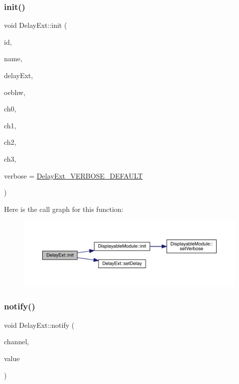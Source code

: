 \subsubsection{\texorpdfstring{init()}{init()}\hspace{0.1cm}{\footnotesize\ttfamily [2/2]}}
{\footnotesize\ttfamily void Delay\+Ext\+::init (\begin{DoxyParamCaption}\item[{int}]{id,  }\item[{char $\ast$}]{name,  }\item[{Audio\+Effect\+Delay\+External $\ast$}]{delay\+Ext,  }\item[{\mbox{\hyperlink{class_open_effects_box_h_w}{Open\+Effects\+Box\+HW}} $\ast$}]{oebhw,  }\item[{int}]{ch0,  }\item[{int}]{ch1,  }\item[{int}]{ch2,  }\item[{int}]{ch3,  }\item[{int}]{verbose = {\ttfamily \mbox{\hyperlink{_delay_ext_8h_a1c2b9cd031a3baecf2c7d96325dcb9b1}{Delay\+Ext\+\_\+\+V\+E\+R\+B\+O\+S\+E\+\_\+\+D\+E\+F\+A\+U\+LT}}} }\end{DoxyParamCaption})}

Here is the call graph for this function\+:\nopagebreak
\begin{figure}[H]
\begin{center}
\leavevmode
\includegraphics[width=350pt]{class_delay_ext_aa7e84d74c1080b5473a7401a5042b305_cgraph}
\end{center}
\end{figure}
\mbox{\label{class_delay_ext_a76001b2a3aad7ce1a2e1220ab7387be4}} 
\subsubsection{\texorpdfstring{notify()}{notify()}}
{\footnotesize\ttfamily void Delay\+Ext\+::notify (\begin{DoxyParamCaption}\item[{int}]{channel,  }\item[{float}]{value }\end{DoxyParamCaption})\hspace{0.3cm}{\ttfamily [virtual]}}



